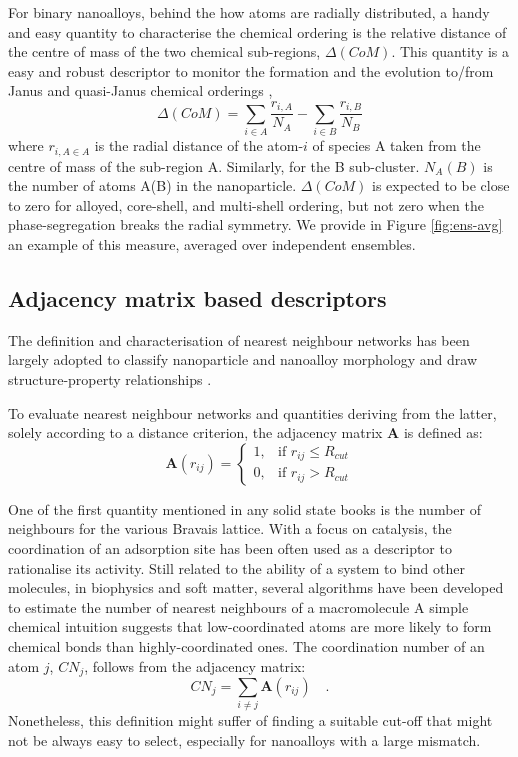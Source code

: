 For binary nanoalloys, behind the how atoms are radially distributed, a handy and easy quantity to characterise the chemical ordering is the relative distance of the centre of mass of the two chemical sub-regions, $\Delta(CoM)$. This quantity is a easy and robust descriptor to monitor the formation and the evolution to/from Janus and quasi-Janus chemical orderings \cite{D2CP00648K},
\begin{equation}
    \Delta(CoM) = \sum_{i \in A} \frac{r_{i,A}}{N_A} - \sum_{i \in B} \frac{r_{i,B}}{N_B} 
\end{equation}
where $r_{i,A \in A}$ is the radial distance of the atom-$i$ of species A taken from the centre of mass of the sub-region A. Similarly, for the B sub-cluster. $N_A(B)$ is the number of atoms A(B) in the nanoparticle. $\Delta(CoM)$ is expected to be close to zero for alloyed, core-shell, and multi-shell ordering, but not zero when the phase-segregation breaks the radial symmetry. We provide in Figure \ref{fig:ens-avg} an example of this measure, averaged over independent ensembles. 

\subsection{Adjacency matrix based descriptors}

The definition and characterisation of nearest neighbour networks has been largely adopted to classify nanoparticle and nanoalloy morphology and draw structure-property relationships \cite{C8NR02278J,Perea2015,Stukowski_2012}.
%

To evaluate nearest neighbour networks and quantities deriving from the latter, solely according to a distance criterion, the adjacency matrix \textbf{A} is defined as:
\begin{equation}
        \textbf{A} \left( r_{ij} \right) = \begin{cases}
    1 ,& \text{if } r_{ij}\leq R_{cut}\\
    0,              & \text{if } r_{ij} > R_{cut}
\end{cases} 
    \label{eqn:CN}
\end{equation}


One of the first quantity mentioned in any solid state books is the number of neighbours for the various Bravais lattice. 
With a focus on catalysis, the coordination of an adsorption site has been often used as a descriptor to rationalise its activity. 
Still related to the ability of a system to bind other molecules, in biophysics and soft matter, several algorithms have been developed to estimate the number of nearest neighbours of a macromolecule \cite{vanmeel2012}
%
A simple chemical intuition suggests that low-coordinated atoms are more likely to form chemical bonds than highly-coordinated ones.
%
The coordination number of an atom $j$, $CN_{j}$,   follows from the adjacency matrix:
\begin{equation}
    CN_{j} = \sum _{i \neq j} \textbf{A} \left( r_{ij} \right) \mbox{~~~.}
    \label{eqn:CN_VM}
\end{equation}
Nonetheless, this definition might suffer of finding a suitable cut-off that might not be always easy to select, especially for nanoalloys with a large mismatch.

